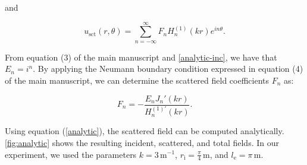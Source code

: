 \documentclass[11pt,twoside]{article}
\begin{document}
\vspace{-5pt}

\noindent and

\vspace{-5pt}

\begin{equation}\label{analytic} 
u_{\text{sct}}(r, \theta) = \sum_{n=-\infty}^{\infty} F_n H_n^{(1)}(kr) e^{in\theta} .
\end{equation}

 From equation (3) of the main manuscript and \ref{analytic-inc}, we have that \( E_n = i^n \). By applying the Neumann boundary condition expressed in equation (4) of the main manuscript, we can determine the scattered field coefficients \( F_n \) as:

\begin{equation*} 
F_n = -\frac{E_n J_n'(kr)}{H_n^{(1)'}(kr)}.
\end{equation*}

 Using equation (\ref{analytic}), the scattered field can be computed analytically. \autoref{fig:analytic} shows the resulting incident, scattered, and total fields. In our experiment, we used the parameters \( k = 3 \, \text{m}^{-1} \), \( r_{\text{i}} = \frac{\pi}{4} \, \text{m} \), and \( l_{\text{e}} = \pi \, \text{m} \).




\end{document}
